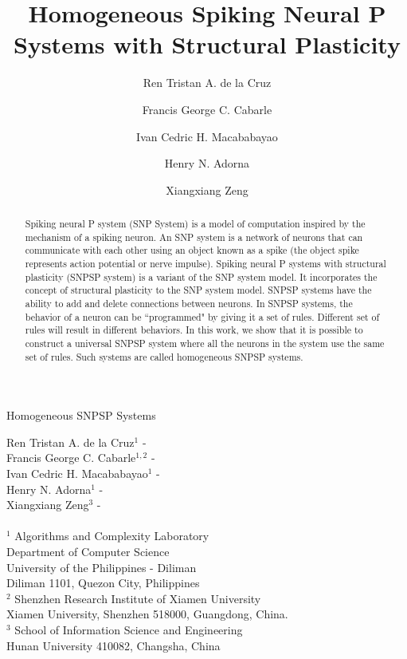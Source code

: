 \documentclass[smallextended]{svjour3}
\begin{document}
\title
{
Homogeneous Spiking Neural P Systems with Structural Plasticity
}

\titlerunning
{
Homogeneous SNPSP Systems
}

\author
{
Ren Tristan A. de la Cruz
\and
Francis George C. Cabarle
\and
Ivan Cedric H. Macababayao
\and
Henry N. Adorna 
\and
Xiangxiang Zeng
}


\institute
{
Ren Tristan A. de la Cruz$^1$     - \mailsa \\
Francis George C. Cabarle$^{1,2}$ - \mailsb \\
Ivan Cedric H. Macababayao$^{1}$  - \mailsc \\
Henry N. Adorna$^1$               - \mailsd \\
Xiangxiang Zeng$^3$               - \mailse \\
\\
$^1$ \at 
Algorithms and Complexity Laboratory    \\
Department of Computer Science          \\
University of the Philippines - Diliman \\
Diliman 1101, Quezon City, Philippines  \\
$^2$ \at
Shenzhen Research Institute of Xiamen University     \\
Xiamen University, Shenzhen 518000, Guangdong, China.\\
$^3$ \at 
School of Information Science and Engineering\\
Hunan University 410082, Changsha, China     \\
}

\maketitle


\begin{abstract}

Spiking neural P system (SNP System) is a model of computation inspired by the mechanism of a spiking neuron. An SNP system is a network of neurons
that can communicate with each other using an object known as a spike (the object spike represents action potential or nerve impulse).  Spiking neural 
P systems with structural plasticity (SNPSP system) is a variant of the SNP system model. It incorporates the concept of structural plasticity to the
SNP system model. SNPSP systems have the ability to add and delete connections between neurons. In SNPSP systems, the behavior of a neuron can be
``programmed" by giving it a set of rules. Different set of rules will result in different behaviors. In this work, we show that it is possible to
construct a universal SNPSP system where all the neurons in the system use the same set of rules. Such systems are called homogeneous SNPSP systems.

\end{abstract}
\end{document}
